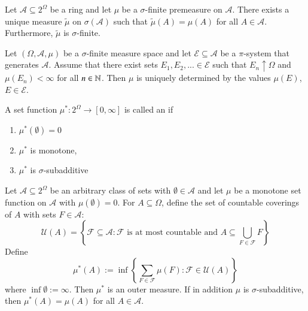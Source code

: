 \documentclass[12pt, a4paper, oneside, openright, titlepage]{book}
\begin{document}
\begin{namthm}[Caratheodory]
    Let $\mathcal{A} \subseteq 2^{\Omega}$ be a ring and let $\mu$ be a $\sigma$-finite premeasure on $\mathcal{A}$. There exists a unique measure $\tilde{\mu}$ on $\sigma(\mathcal{A})$ such that $\tilde{\mu}(A) = \mu(A)$ for all $A \in \mathcal{A}$. Furthermore, $\tilde{\mu}$ is $\sigma$-finite.
\end{namthm}

\begin{lem}
    Let $(\Omega,\mathcal{A},\mu)$ be a $\sigma$-finite measure space and let $\mathcal{E}\subseteq \mathcal{A}$ be a $\pi$-system that generates $\mathcal{A}$. Assume that there exist sets $E_1,E_2,... \in \mathcal{E}$ such that $E_n\uparrow \Omega$ and $\mu(E_n) < \infty$ for all $n \in \mathbb N$. Then $\mu$ is uniquely determined by the values $\mu(E)$, $E \in \mathcal{E}$.
\end{lem}


\begin{defn}
    A set function $\mu^*:2^{\Omega}\rightarrow [0,\infty]$ is called an  if \begin{enumerate}[label=\roman*]
        \item $\mu^*(\emptyset) = 0$ 
        \item $\mu^*$ is monotone,
        \item $\mu^*$ is $\sigma$-subadditive
    \end{enumerate}
\end{defn}

\begin{lem}
    Let $\mathcal{A}\subseteq 2^{\Omega}$ be an arbitrary class of sets with $\emptyset \in \mathcal{A}$ and let $\mu$ be a monotone set function on $\mathcal{A}$ with $\mu(\emptyset) = 0$. For $A \subseteq \Omega$, define the set of countable coverings of $A$ with sets $F \in \mathcal{A}$: \begin{equation*}
        \mathcal{U}(A) = \left\{\mathcal{F} \subseteq \mathcal{A}:\mathcal{F} \text{ is at most countable and } A \subseteq \bigcup_{F\in\mathcal{F}}F\right\}
    \end{equation*}
    Define \begin{equation*}
        \mu^*(A) := \inf\left\{\sum_{F\in\mathcal{F}}\mu(F):\mathcal{F}\in\mathcal{U}(A)\right\}
    \end{equation*}
    where $\inf\emptyset := \infty$. Then $\mu^*$ is an outer measure. If in addition $\mu$ is $\sigma$-subadditive, then $\mu^*(A) = \mu(A)$ for all $A \in \mathcal{A}$.
\end{lem}
\end{document}
